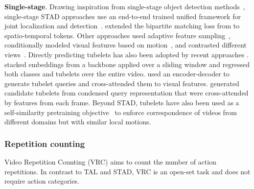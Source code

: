 \noindent
\textbf{Single-stage}. Drawing inspiration from single-stage object detection methods~\citep{carion2020end,redmon2016you,liu2016ssd}, single-stage STAD approaches use an end-to-end trained unified framework for joint localization and detection~\citep{chen2021watch,girdhar2019video,zhu2024dual}. \citet{ntinou2024multiscale} extended the bipartite matching loss from \citet{carion2020end} to spatio-temporal tokens. Other approaches used adaptive feature sampling~\citep{wu2023stmixer}, conditionally modeled visual features based on motion~\citep{zhao2019dance}, and contrasted different views~\citep{kumar2022end}. Directly predicting tubelets has also been adopted by recent approaches \citep{gritsenko2024end,kalogeiton2017action,song2019tacnet,yang2019step,zhao2022tuber}. \citet{kalogeiton2017action} stacked embeddings from a backbone applied over a sliding window and regressed both classes and tubelets over the entire video. \citet{zhao2022tuber} used an encoder-decoder to generate tubelet queries and cross-attended them to visual features. \citet{gritsenko2024end} generated candidate tubelets from condensed query representation that were cross-attended by features from each frame. Beyond STAD, tubelets have also been used as a self-similarity pretraining objective~\citep{thoker2023tubelet} to enforce correspondence of videos from different domains but with similar local motions. 

\subsubsection{Repetition counting}

Video Repetition Counting (VRC) aims to count the number of action repetitions. In contrast to TAL and STAD, VRC is an open-set task and does not require action categories.



